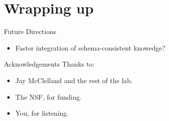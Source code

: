 \documentclass{beamer}
\begin{document}
\section{Wrapping up}


\begin{frame}{Future Directions}
\begin{itemize}
    \item<1-> Faster integration of schema-consistent knowedge?
\end{itemize}
\end{frame}

\begin{frame}{Acknowledgements}
Thanks to:
\begin{itemize}
    \item Jay McClelland and the rest of the lab.
    \item The NSF, for funding.
    \item You, for listening. 
\end{itemize}
\end{frame}

\begin{frame}[allowframebreaks]


\end{frame}
\end{document}
